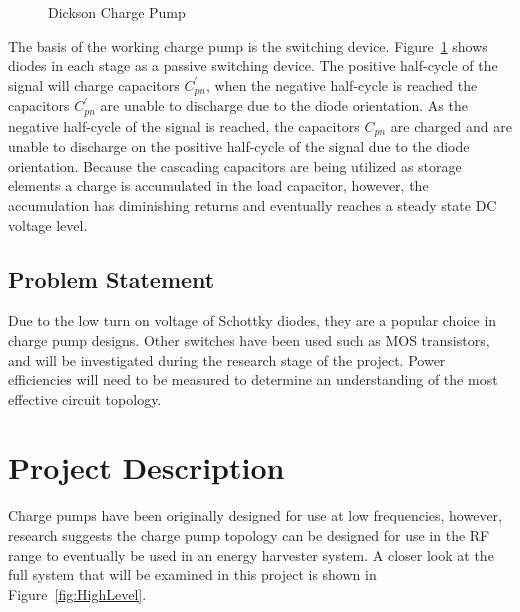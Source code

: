 \documentclass[12pt]{article}
\begin{document}
\begin{figure}[H]
\caption{Dickson Charge Pump \cite{Guler}}
\label{fig:DicksonCP}
\end{figure}

\noindent The basis of the working charge pump is the switching device. Figure~\ref{fig:DicksonCP} shows diodes in each stage as a passive switching device. The positive half-cycle of the signal will charge capacitors $C^{'}_{pn}$, when the negative half-cycle is reached the capacitors $C^{'}_{pn}$ are unable to discharge due to the diode orientation. As the negative half-cycle of the signal is reached, the capacitors $C_{pn}$ are charged and are unable to discharge on the positive half-cycle of the signal due to the diode orientation. Because the cascading capacitors are being utilized as storage elements a charge is accumulated in the load capacitor, however, the accumulation has diminishing returns and eventually reaches a steady state DC voltage level.\\

\subsection{Problem Statement}
Due to the low turn on voltage of Schottky diodes, they are a popular choice in charge pump designs. Other switches have been used such as MOS transistors, and will be investigated during the research stage of the project. Power efficiencies will need to be measured to determine an understanding of the most effective circuit topology.

\section{Project Description}
Charge pumps have been originally designed for use at low frequencies, however, research suggests the charge pump topology can be designed for use in the RF range to eventually be used in an energy harvester system. A closer look at the full system that will be examined in this project is shown in Figure~\ref{fig:HighLevel}.
	
\end{document}

